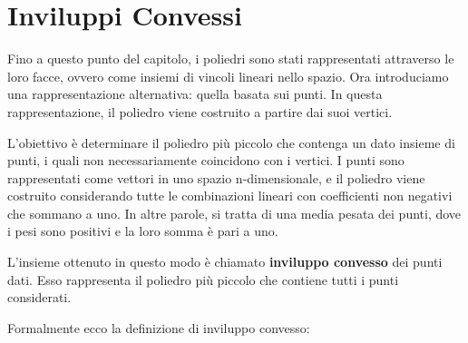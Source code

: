 \section{Inviluppi Convessi}
Fino a questo punto del capitolo, i poliedri sono stati rappresentati attraverso le loro facce, ovvero come insiemi di vincoli lineari nello spazio. Ora introduciamo una rappresentazione alternativa: quella basata sui punti. In questa rappresentazione, il poliedro viene costruito a partire dai suoi vertici.

L'obiettivo è determinare il poliedro più piccolo che contenga un dato insieme di punti, i quali non necessariamente coincidono con i vertici. I punti sono rappresentati come vettori in uno spazio n-dimensionale, e il poliedro viene costruito considerando tutte le combinazioni lineari con coefficienti non negativi che sommano a uno. In altre parole, si tratta di una media pesata dei punti, dove i pesi sono positivi e la loro somma è pari a uno.

L'insieme ottenuto in questo modo è chiamato \textbf{inviluppo convesso} dei punti dati. Esso rappresenta il poliedro più piccolo che contiene tutti i punti considerati.

Formalmente ecco la definizione di inviluppo convesso:


